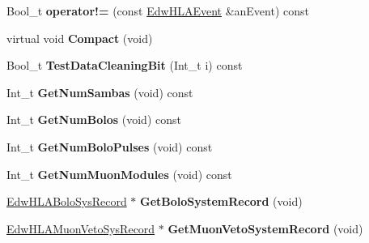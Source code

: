 \begin{DoxyCompactItemize}
\item 
\hypertarget{class_edw_h_l_a_event_a27744766be59b027877808be9352b34d}{
Bool\_\-t {\bfseries operator!=} (const \hyperlink{class_edw_h_l_a_event}{EdwHLAEvent} \&anEvent) const }
\label{class_edw_h_l_a_event_a27744766be59b027877808be9352b34d}

\item 
\hypertarget{class_edw_h_l_a_event_a6a6c68e37b870423d0893e8e61afaf9c}{
virtual void {\bfseries Compact} (void)}
\label{class_edw_h_l_a_event_a6a6c68e37b870423d0893e8e61afaf9c}

\item 
\hypertarget{class_edw_h_l_a_event_ae2478dfa5bfaac11341525c2ba7eef05}{
Bool\_\-t {\bfseries TestDataCleaningBit} (Int\_\-t i) const }
\label{class_edw_h_l_a_event_ae2478dfa5bfaac11341525c2ba7eef05}

\item 
\hypertarget{class_edw_h_l_a_event_aa1b865d4507b51959abef83946c4f444}{
Int\_\-t {\bfseries GetNumSambas} (void) const }
\label{class_edw_h_l_a_event_aa1b865d4507b51959abef83946c4f444}

\item 
\hypertarget{class_edw_h_l_a_event_a76575996516af91aea954c5d3f288028}{
Int\_\-t {\bfseries GetNumBolos} (void) const }
\label{class_edw_h_l_a_event_a76575996516af91aea954c5d3f288028}

\item 
\hypertarget{class_edw_h_l_a_event_afd285047a6bbc39a9429843b308c6ff1}{
Int\_\-t {\bfseries GetNumBoloPulses} (void) const }
\label{class_edw_h_l_a_event_afd285047a6bbc39a9429843b308c6ff1}

\item 
\hypertarget{class_edw_h_l_a_event_ad71b249f7d4c835e66c65ce12c2fe5a1}{
Int\_\-t {\bfseries GetNumMuonModules} (void) const }
\label{class_edw_h_l_a_event_ad71b249f7d4c835e66c65ce12c2fe5a1}

\item 
\hypertarget{class_edw_h_l_a_event_ab6161ffd0af9d36fc38f3c85e4991abf}{
\hyperlink{class_edw_h_l_a_bolo_sys_record}{EdwHLABoloSysRecord} $\ast$ {\bfseries GetBoloSystemRecord} (void)}
\label{class_edw_h_l_a_event_ab6161ffd0af9d36fc38f3c85e4991abf}

\item 
\hypertarget{class_edw_h_l_a_event_a81cdd6110d9e6b78161d021d57ed9ddc}{
\hyperlink{class_edw_h_l_a_muon_veto_sys_record}{EdwHLAMuonVetoSysRecord} $\ast$ {\bfseries GetMuonVetoSystemRecord} (void)}
\label{class_edw_h_l_a_event_a81cdd6110d9e6b78161d021d57ed9ddc}


\end{DoxyCompactItemize}
